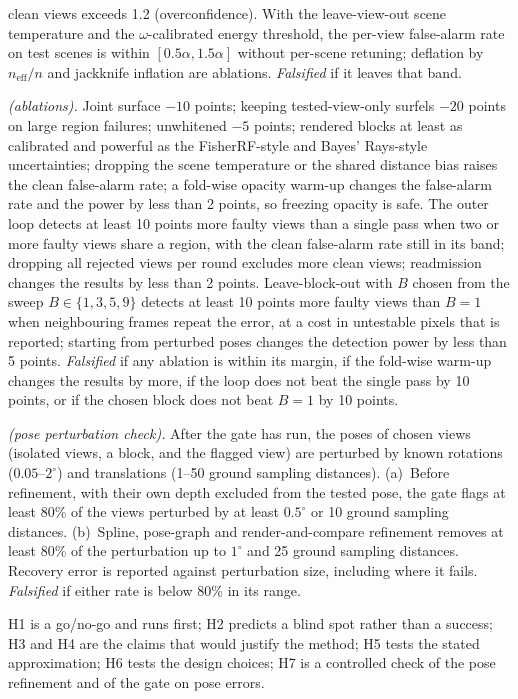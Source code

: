 \begin{description}
        clean views exceeds 1.2 (overconfidence). With the leave-view-out scene temperature and the
        $\omega$-calibrated energy threshold, the per-view false-alarm rate on test scenes is within
        $[0.5\alpha,1.5\alpha]$ without per-scene retuning; deflation by $n_{\mathrm{eff}}/n$ and
        jackknife inflation are ablations. \emph{Falsified} if it leaves that band.
  \item[H6] \emph{(ablations).} Joint surface $-10$ points; keeping tested-view-only surfels $-20$
        points on large region failures; unwhitened $-5$ points; rendered blocks at least as calibrated
        and powerful as the FisherRF-style and Bayes' Rays-style uncertainties; dropping the scene
        temperature or the shared distance bias raises the clean false-alarm rate; a fold-wise opacity
        warm-up changes the false-alarm rate and the power by less than 2 points, so freezing opacity is
        safe. The outer loop detects at least 10 points more faulty views than a single pass when two or
        more faulty views share a region, with the clean false-alarm rate still in its band; dropping
        all rejected views per round excludes more clean views; readmission changes the results by
        less than 2 points. Leave-block-out with $B$ chosen from the sweep $B\in\{1,3,5,9\}$ detects at least
        10 points more faulty views than $B=1$ when neighbouring frames repeat the error, at a cost in
        untestable pixels that is reported; starting from perturbed poses changes the detection power
        by less than 5 points. \emph{Falsified} if any ablation is within its margin, if the fold-wise
        warm-up changes the results by more, if the loop does not beat the single pass by 10 points,
        or if the chosen block does not beat $B=1$ by 10 points.
  \item[H7] \emph{(pose perturbation check).} After the gate has run, the poses of chosen views (isolated
        views, a block, and the flagged view) are perturbed by known rotations
        ($0.05$--$2^{\circ}$) and translations (1--50 ground sampling distances). (a)~Before refinement, with
        their own depth excluded from the tested pose, the gate flags at least 80\% of the views
        perturbed by at least $0.5^{\circ}$ or 10 ground sampling distances. (b)~Spline, pose-graph and
        render-and-compare refinement removes at least 80\% of the perturbation up to $1^{\circ}$ and 25
        ground sampling distances. Recovery error is reported against perturbation size, including where
        it fails. \emph{Falsified} if either rate is below 80\% in its range.
\end{description}
H1 is a go/no-go and runs first; H2 predicts a blind spot rather than a success; H3 and H4 are the
claims that would justify the method; H5 tests the stated approximation; H6 tests the design choices; H7 is a controlled check of the
pose refinement and of the gate on pose errors.

